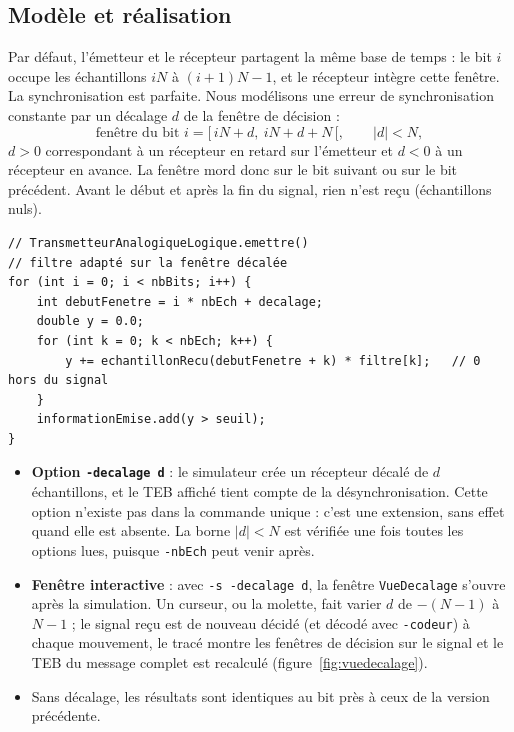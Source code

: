 \documentclass[11pt,a4paper]{article}
\newcommand{\cls}[1]{\texttt{#1}}
\begin{document}
\subsection{Modèle et réalisation}
Par défaut, l'émetteur et le récepteur partagent la même base de temps : le bit $i$ occupe les échantillons $iN$ à $(i+1)N - 1$, et le récepteur intègre cette fenêtre. La synchronisation est parfaite. Nous modélisons une erreur de synchronisation constante par un décalage $d$ de la fenêtre de décision :
\[ \text{fenêtre du bit } i = \big[\, iN + d,\ iN + d + N \,\big[, \qquad |d| < N, \]
$d > 0$ correspondant à un récepteur en retard sur l'émetteur et $d < 0$ à un récepteur en avance. La fenêtre mord donc sur le bit suivant ou sur le bit précédent. Avant le début et après la fin du signal, rien n'est reçu (échantillons nuls).
\begin{lstlisting}
// TransmetteurAnalogiqueLogique.emettre()
// filtre adapté sur la fenêtre décalée
for (int i = 0; i < nbBits; i++) {
    int debutFenetre = i * nbEch + decalage;
    double y = 0.0;
    for (int k = 0; k < nbEch; k++) {
        y += echantillonRecu(debutFenetre + k) * filtre[k];   // 0 hors du signal
    }
    informationEmise.add(y > seuil);
}
\end{lstlisting}
\begin{itemize}
  \item \textbf{Option \texttt{-decalage d}} : le simulateur crée un récepteur décalé de $d$ échantillons, et le TEB affiché tient compte de la désynchronisation. Cette option n'existe pas dans la commande unique : c'est une extension, sans effet quand elle est absente. La borne $|d| < N$ est vérifiée une fois toutes les options lues, puisque \texttt{-nbEch} peut venir après.
  \item \textbf{Fenêtre interactive} : avec \texttt{-s -decalage d}, la fenêtre \cls{VueDecalage} s'ouvre après la simulation. Un curseur, ou la molette, fait varier $d$ de $-(N-1)$ à $N-1$ ; le signal reçu est de nouveau décidé (et décodé avec \texttt{-codeur}) à chaque mouvement, le tracé montre les fenêtres de décision sur le signal et le TEB du message complet est recalculé (figure~\ref{fig:vuedecalage}).
  \item Sans décalage, les résultats sont identiques au bit près à ceux de la version précédente.
\end{itemize}
\end{document}
